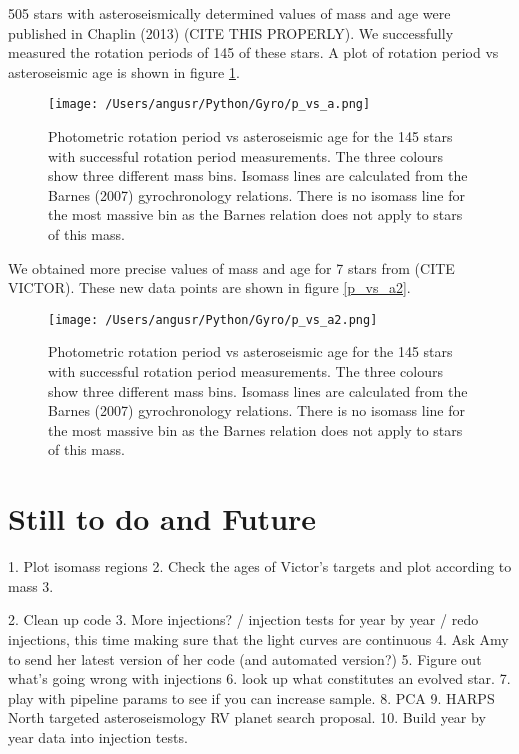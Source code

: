 \documentclass[12pt,preprint]{aastex}
\begin{document}
505 stars with asteroseismically determined values of mass and age were published in Chaplin (2013) (CITE THIS PROPERLY). 
We successfully measured the rotation periods of 145 of these stars. 
A plot of rotation period vs asteroseismic age is shown in figure \ref{fig:p_vs_a}.


\begin{figure}[ht]
\begin{center}
\texttt{[image: /Users/angusr/Python/Gyro/p\_vs\_a.png]}
\caption{Photometric rotation period vs asteroseismic age for the 145 stars with successful rotation period measurements. The three colours show three different mass bins. Isomass lines are calculated from the Barnes (2007) gyrochronology relations. There is no isomass line for the most massive bin as the Barnes relation does not apply to stars of this mass. }
\label{fig:p_vs_a}
\end{center}
\end{figure}

We obtained more precise values of mass and age for 7 stars from (CITE VICTOR).
These new data points are shown in figure \ref{p_vs_a2}. 

\begin{figure}[ht]
\begin{center}
\texttt{[image: /Users/angusr/Python/Gyro/p\_vs\_a2.png]}
\caption{Photometric rotation period vs asteroseismic age for the 145 stars with successful rotation period measurements. The three colours show three different mass bins. Isomass lines are calculated from the Barnes (2007) gyrochronology relations. There is no isomass line for the most massive bin as the Barnes relation does not apply to stars of this mass. }
\label{fig:p_vs_a2}
\end{center}
\end{figure}

\section{Still to do and Future}

1. Plot isomass regions
2. Check the ages of Victor's targets and plot according to mass
3. 

2. Clean up code
3. More injections? / injection tests for year by year / redo injections, this time making sure that the light curves are continuous
4. Ask Amy to send her latest version of her code (and automated version?)
5. Figure out what's going wrong with injections
6. look up what constitutes an evolved star.
7. play with pipeline params to see if you can increase sample.
8. PCA
9. HARPS North targeted asteroseismology RV planet search proposal.
10. Build year by year data into injection tests. 
\end{document}
